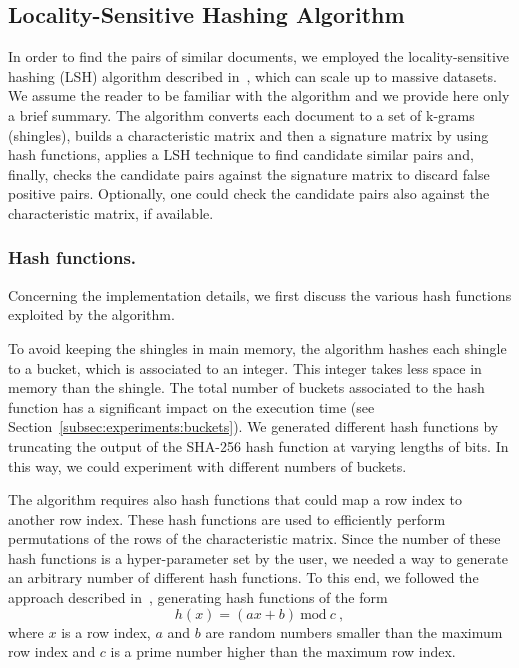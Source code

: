 \documentclass[runningheads]{llncs}
\begin{document}
\subsection{Locality-Sensitive Hashing Algorithm}
\label{subsec:models:lsh}

In order to find the pairs of similar documents, we employed the locality-sensitive hashing (LSH) algorithm described in~\cite{leskovec_2020}, which can scale up to massive datasets. We assume the reader to be familiar with the algorithm and we provide here only a brief summary. The algorithm converts each document to a set of k-grams (shingles), builds a characteristic matrix and then a signature matrix by using hash functions, applies a LSH technique to find candidate similar pairs and, finally, checks the candidate pairs against the signature matrix to discard false positive pairs. Optionally, one could check the candidate pairs also against the characteristic matrix, if available.

\subsubsection{Hash functions.} Concerning the implementation details, we first discuss the various hash functions exploited by the algorithm. 

To avoid keeping the shingles in main memory, the algorithm hashes each shingle to a bucket, which is associated to an integer. This integer takes less space in memory than the shingle. The total number of buckets associated to the hash function has a significant impact on the execution time (see Section~\ref{subsec:experiments:buckets}). We generated different hash functions by truncating the output of the SHA-256 hash function at varying lengths of bits. In this way, we could experiment with different numbers of buckets.  

The algorithm requires also hash functions that could map a row index to another row index. These hash functions are used to efficiently perform permutations of the rows of the characteristic matrix. Since the number of these hash functions is a hyper-parameter set by the user, we needed a way to generate an arbitrary number of different hash functions. To this end, we followed the approach described in~\cite{liu_2015}, generating hash functions of the form
\[
  h(x) = (ax + b)~\text{mod}~c~,  
\]
where $x$ is a row index, $a$ and $b$ are random numbers smaller than the maximum row index and $c$ is a prime number higher than the maximum row index.
\end{document}
